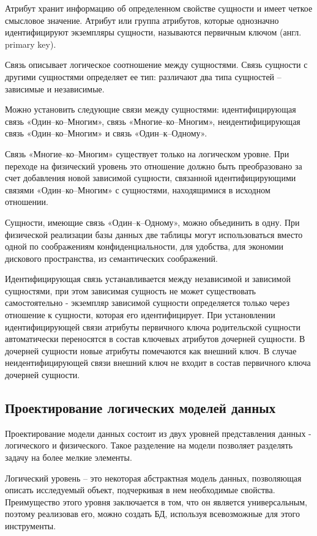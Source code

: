 Атрибут хранит информацию об определенном свойстве сущности и имеет четкое смысловое значение. Атрибут или группа атрибутов, которые однозначно идентифицируют экземпляры сущности, называются первичным ключом (англ. primary key).

Связь описывает логическое соотношение между сущностями. Связь сущности с другими сущностями определяет ее тип: различают два типа сущностей – зависимые и независимые.

Можно установить следующие связи между сущностями: идентифицирующая связь «Один–ко–Многим», связь «Многие–ко–Многим», неидентифицирующая связь «Один–ко–Многим» и связь «Один–к–Одному».

Связь «Многие–ко–Многим» существует только на логическом уровне. При переходе на физический уровень это отношение должно быть преобразовано за счет добавления новой зависимой сущности, связанной идентифицирующими связями «Один–ко–Многим» с сущностями, находящимися в исходном отношении.

Сущности, имеющие связь «Один–к–Одному», можно объединить в одну. При физической реализации базы данных две таблицы могут использоваться вместо одной по соображениям конфиденциальности, для удобства, для экономии дискового пространства, из семантических соображений.

Идентифицирующая связь устанавливается между независимой и зависимой сущностями, при этом зависимая сущность не может существовать самостоятельно - экземпляр зависимой сущности определяется только через отношение к сущности, которая его идентифицирует. При установлении идентифицирующей связи атрибуты первичного ключа родительской сущности автоматически переносятся в состав ключевых атрибутов дочерней сущности.  В дочерней сущности новые атрибуты помечаются как внешний ключ. В случае неидентифицирующей связи внешний ключ не входит в состав первичного ключа дочерней сущности.



\subsection{Проектирование логических моделей данных}

Проектирование модели данных состоит из двух уровней представления данных - логического и физического. Такое разделение на модели позволяет разделять задачу на более мелкие элементы.

Логический уровень – это некоторая абстрактная модель данных, позволяющая описать исследуемый объект, подчеркивая в нем необходимые свойства. Преимущество этого уровня заключается в том, что он является универсальным, поэтому реализовав его, можно создать БД, используя всевозможные для этого инструменты.

